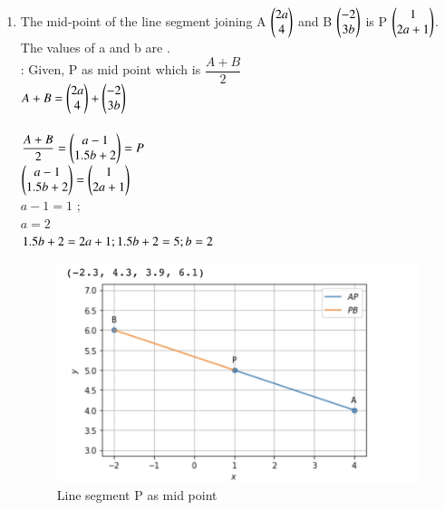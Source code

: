 \documentclass[journal,12pt,twocolumn]{IEEEtran}
\renewcommand\thesection{\arabic{section}}
\begin{document}
\begin{enumerate}[label=\thesection.\arabic*.,ref=\thesection.\theenumi]
\item The mid-point of the line segment joining A $\begin{pmatrix}2a\\4\end{pmatrix}$ and B $\begin{pmatrix}-2\\3b\end{pmatrix}$ is P $\begin{pmatrix}1\\2a+1\end{pmatrix}$. The values of a and b are .\\ 
\solution:
Given, P as mid point which is $\dfrac{A+B}{2}$\\
$A+B = \begin{pmatrix}2a\\4\end{pmatrix} + \begin{pmatrix}-2\\3b\end{pmatrix}$ \\ \\
$\dfrac{A+B}{2} =  \begin{pmatrix}a-1\\1.5b+2\end{pmatrix} = P$ \\
$ \begin{pmatrix}a-1\\1.5b+2\end{pmatrix} = \begin{pmatrix}1\\2a+1\end{pmatrix} $ \\
$ a -1 =1$ ; \\
$a =2 $ \\
$1.5b+2 = 2a+1 ; 1.5b+2 = 5;\\
b = 2 $ \\
   \begin{figure}
	  \centering 
	  \includegraphics[width=\columnwidth]{3.6}
	  \caption{Line segment P as mid point}
	  \label{fig:geometry-3.9.pdf}
  \end{figure}


\end{enumerate}
\end{document}
